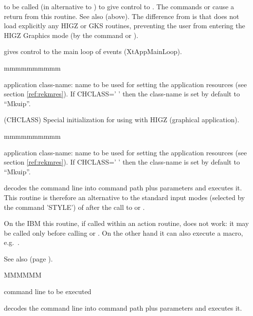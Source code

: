 \Vskip{}
\Action to be called (in alternative to ) to give control to \KUIP{}.
The commands  or  
cause a return from this routine.
See also  (above).
The difference from  is that  does not load explicitly any
HIGZ \cite{bib-HIGZ}
or
GKS \cite{bib-GKS1} routines, preventing the user
from entering the HIGZ Graphics mode (by the command 
 or ).


\Vskip{}
\label{ref:rekuwham}
\Action gives control to the \Motif{} main loop of events (XtAppMainLoop).
\Pdesc\begin{DLtt}{mmmmmmmmmm}
\item[CHCLASS] application class-name: name 
to be used for setting the application resources (see section 
\ref{ref:rekmres}). If CHCLASS=' ' then the class-name is set by default
to ``Mkuip''.
\end{DLtt}

 {(CHCLASS)}
\Action Special \KUIP{} initialization for using \KUIPMotif{} with HIGZ (graphical 
application).
\Pdesc\begin{DLtt}{mmmmmmmmmm}
\item[CHCLASS] application class-name: name 
to be used for setting the application resources (see section
\ref{ref:rekmres}). If CHCLASS=' ' then the class-name is set by default
to ``Mkuip''.
\end{DLtt}

\Vskip{}
\Action decodes the command line  into command path plus parameters
and executes it.
This routine is therefore an alternative to the standard input modes
(selected by the command 'STYLE') of \KUIP{} after the call to
 or .

On the IBM this routine, if called within an action routine,
does not work: it may be called
only before calling  or . On the other hand it can also execute
a macro, e.g.\ .

See also (page \pageref{ref:rekuex}).
\Pdesc\begin{DLtt}{MMMMMM}
\item[CHLINE] command line to be executed
\end{DLtt}

\label{ref:rekuex}
\Action decodes the command line  into command path plus parameters
and executes it.

